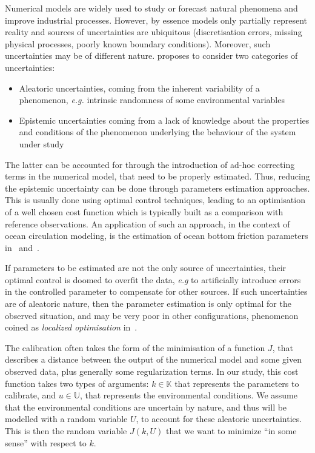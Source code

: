 \documentclass[../../Main_ManuscritThese.tex]{subfiles}
\begin{document}
Numerical models are widely used to study or forecast natural phenomena and improve industrial processes. However, by essence models only partially represent reality and sources of uncertainties are ubiquitous (discretisation errors, missing physical processes, poorly known boundary conditions).  Moreover, such uncertainties may be of different nature. \cite{walker_defining_2003} proposes to consider two categories of uncertainties:
\begin{itemize}
\item Aleatoric uncertainties, coming from the inherent variability of a phenomenon, \emph{e.g.} intrinsic randomness of some environmental variables
\item Epistemic uncertainties coming from a lack of knowledge about the properties and conditions of the phenomenon underlying the behaviour of the system under study
\end{itemize}
  The latter can be accounted for through the introduction of ad-hoc correcting terms in the numerical model, that need to be properly estimated. Thus, reducing the epistemic uncertainty can be done through parameters estimation approaches. This is usually done using optimal control techniques, leading to an optimisation of a well chosen cost function which is typically built as a comparison with reference observations.
%
  An application of such an approach, in the context of ocean circulation modeling, is the estimation of ocean bottom friction parameters in~\cite{das_estimation_1991} and~\cite{boutet_estimation_2015}.

  If parameters to be estimated are not the only source of uncertainties, their optimal control 
  is doomed to overfit the data, \emph{e.g} to artificially introduce errors in the controlled parameter to compensate for other sources. If such uncertainties are of aleatoric nature, then the parameter estimation is only optimal for the observed situation, and may be very poor in other configurations, phenomenon coined as \textit{localized optimisation} in~\cite{huyse_free-form_2001}.
  
  The calibration often takes the form of the minimisation of a function $J$, that describes a distance between the output of the numerical model and some given observed data, plus generally some regularization terms.
  In our study, this cost function takes two types of arguments: $k\in\mathbb{K}$ that represents the parameters to calibrate, and $u\in\mathbb{U}$, that represents the environmental conditions.
  We assume that the environmental conditions are uncertain by nature, and thus will be modelled with a random variable $U$, to account for these aleatoric uncertainties.
  This is then the random variable $J(k,U)$ that we want to minimize ``in some sense'' with respect to $k$.
\end{document}
